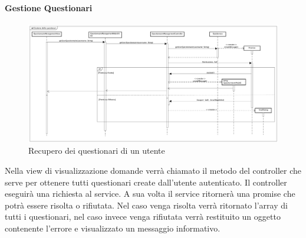 \paragraph{Gestione Questionari}

\label{Recupero dei questionari di un utente}

\begin{figure}[ht]
	\centering
	\includegraphics[scale=0.25,keepaspectratio]{UML/DiagrammiDiSequenza/Front-end/QuestionnaireManagement.png}
	\caption{Recupero dei questionari di un utente}
\end{figure} \FloatBarrier

Nella view di visualizzazione domande verrà chiamato il metodo del controller che serve per ottenere tutti questionari create dall'utente autenticato. Il controller eseguirà una richiesta al service. A sua volta il service ritornerà una promise che potrà essere risolta o rifiutata. Nel caso venga risolta verrà ritornato l'array di tutti i questionari, nel caso invece venga rifiutata verrà restituito un oggetto contenente l'errore e visualizzato un messaggio informativo. 